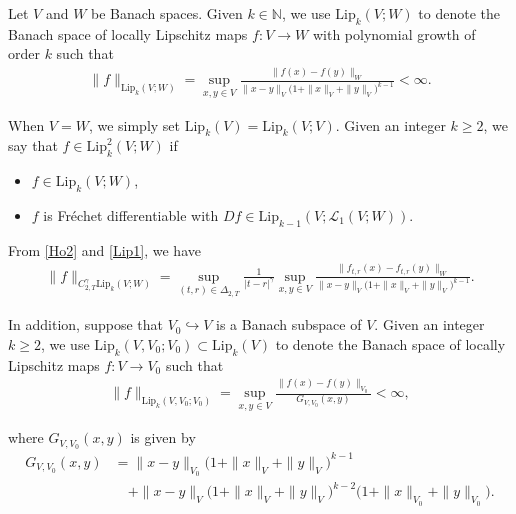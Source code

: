 \documentclass[letterpaper, 11pt,  reqno]{amsart}
\newcommand{\1}{\hspace{0.5mm}\textup{I}\hspace{0.5mm}}
\newcommand{\noi}{\noindent}
\newcommand{\Dl}{\Delta}
\newcommand{\g}{\gamma}
\newcommand{\N}{\mathbb{N}}
\newcommand{\cL}{\mathcal{L}}
\newcommand{\Lip}{\mathrm{Lip}}
\numberwithin{equation}{section}
\numberwithin{theorem}{section}
\begin{document}
Let $V$ and $W$ be Banach spaces.
Given $k \in \N$, 
we  use $\Lip_k(V; W)$ 
to denote the Banach space of 
locally Lipschitz maps $f:V\to W$
with polynomial growth of order $k$
such that 
\begin{align}
\|f\|_{\Lip_k(V; W)} = 
\sup_{x,y\in V} 
\frac{\|f(x)-f(y)\|_W}{\|x-y\|_V \big(1+\|x\|_V+\|y\|_V\big)^{k-1}}
<\infty .
\label{Lip1}
\end{align}



\noi
When $V = W$, 
we simply set $\Lip_k(V)= \Lip_k(V;V)$.
Given an integer $k \ge 2$, 
we say that $f\in\Lip^2_k(V; W)$ 
if 
\smallskip

\begin{itemize}
\item[(i)] $f\in\Lip_k(V; W)$, 


\smallskip
\item[(ii)]
 $f$ is Fr\'echet differentiable 
with 
$Df \in \Lip_{k-1}(V;\cL_1(V; W))$.


\end{itemize}





\smallskip

\noi
From \eqref{Ho2} and \eqref{Lip1}, we have 
\begin{align}
\|f \|_{C^\g_{2, T}\Lip_k(V;W)}
= \sup_{(t,r) \in \Dl_{2,T}}
\frac 1{|t-r|^{\g}}
\sup_{x,y\in V} 
\frac{\| f_{t, r}(x)- f_{t, r}(y)\|_W}{\|x-y\|_V \big(1+\|x\|_V+\|y\|_V\big)^{k-1}}.
\label{Ho3}
\end{align}




\noi
In addition, suppose that $V_0 \hookrightarrow V$
is a Banach subspace of $V$.
Given an integer $k \ge 2$, %
we  use $\Lip_k(V, V_0; V_0)\subset  \Lip_k(V)$ 
to denote the Banach space of 
locally Lipschitz maps $f:V\to V_0$
such that 
\begin{align}
\|f\|_{\Lip_k(V, V_0; V_0)}
= 
\sup_{x,y\in V} 
\frac{\|f(x)-f(y)\|_{V_0}}
{G_{V, V_0}(x, y)}
<\infty , 
\label{Lip2}
\end{align}

\noi
where $G_{V, V_0}(x, y)$ is given by 
\begin{align*}
G_{V, V_0}(x, y)
& = \|x-y\|_{V_0} \big(1+\|x\|_{V}+\|y\|_{V}\big)^{k-1}\\
& \quad + \|x-y\|_{V} \big(1+\|x\|_{V}+\|y\|_{V}\big)^{k-2}
 \big(1+\|x\|_{V_0}+\|y\|_{V_0}\big).
\end{align*}
\end{document}
